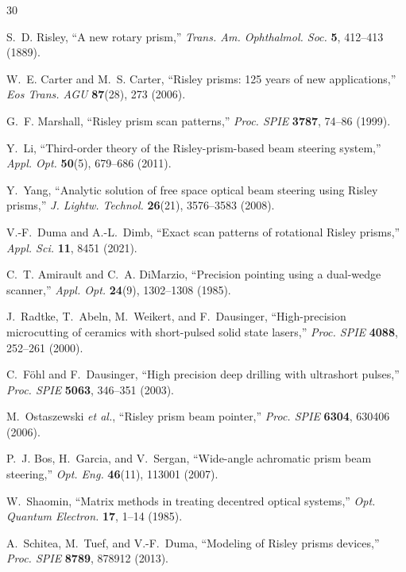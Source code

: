 \documentclass[twocolumn,preprintnumbers,amsmath,amssymb,pra,floatfix]{revtex4-2}
\begin{document}
\begin{thebibliography}{30}

S.~D. Risley, ``A new rotary prism,''
\emph{Trans. Am. Ophthalmol. Soc.} \textbf{5}, 412--413 (1889).

W.~E. Carter and M.~S. Carter, ``Risley prisms: 125 years of new applications,''
\emph{Eos Trans. AGU} \textbf{87}(28), 273 (2006).

G.~F. Marshall, ``Risley prism scan patterns,''
\emph{Proc. SPIE} \textbf{3787}, 74--86 (1999).

Y.~Li, ``Third-order theory of the Risley-prism-based beam steering system,''
\emph{Appl. Opt.} \textbf{50}(5), 679--686 (2011).

Y.~Yang, ``Analytic solution of free space optical beam steering using Risley prisms,''
\emph{J. Lightw. Technol.} \textbf{26}(21), 3576--3583 (2008).

V.-F.~Duma and A.-L.~Dimb, ``Exact scan patterns of rotational Risley prisms,''
\emph{Appl. Sci.} \textbf{11}, 8451 (2021).

C.~T. Amirault and C.~A. DiMarzio, ``Precision pointing using a dual-wedge scanner,''
\emph{Appl. Opt.} \textbf{24}(9), 1302--1308 (1985).

J.~Radtke, T.~Abeln, M.~Weikert, and F.~Dausinger, ``High-precision
microcutting of ceramics with short-pulsed solid state lasers,''
\emph{Proc. SPIE} \textbf{4088}, 252--261 (2000).

C.~F\"ohl and F.~Dausinger, ``High precision deep drilling with ultrashort pulses,''
\emph{Proc. SPIE} \textbf{5063}, 346--351 (2003).

M.~Ostaszewski \emph{et al.}, ``Risley prism beam pointer,''
\emph{Proc. SPIE} \textbf{6304}, 630406 (2006).

P.~J. Bos, H.~Garcia, and V.~Sergan, ``Wide-angle achromatic prism beam steering,''
\emph{Opt. Eng.} \textbf{46}(11), 113001 (2007).

W.~Shaomin, ``Matrix methods in treating decentred optical systems,''
\emph{Opt. Quantum Electron.} \textbf{17}, 1--14 (1985).

A.~Schitea, M.~Tuef, and V.-F.~Duma, ``Modeling of Risley prisms devices,''
\emph{Proc. SPIE} \textbf{8789}, 878912 (2013).


\end{thebibliography}
\end{document}
